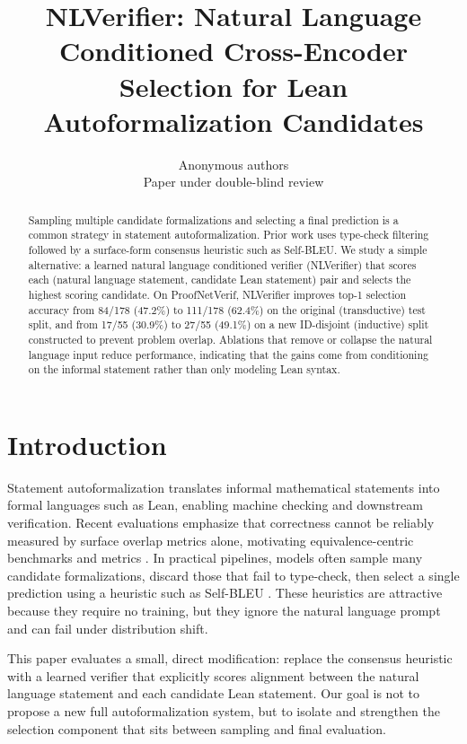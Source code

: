 \documentclass{article}
\title{NLVerifier: Natural Language Conditioned Cross-Encoder Selection for Lean Autoformalization Candidates}
\author{Anonymous authors\\
Paper under double-blind review
}
\begin{document}
\maketitle

\begin{abstract}
Sampling multiple candidate formalizations and selecting a final prediction is a common strategy in statement autoformalization.
Prior work uses type-check filtering followed by a surface-form consensus heuristic such as Self-BLEU.
We study a simple alternative: a learned natural language conditioned verifier (NLVerifier) that scores each (natural language statement, candidate Lean statement) pair and selects the highest scoring candidate.
On ProofNetVerif, NLVerifier improves top-1 selection accuracy from 84/178 (47.2\%) to 111/178 (62.4\%) on the original (transductive) test split, and from 17/55 (30.9\%) to 27/55 (49.1\%) on a new ID-disjoint (inductive) split constructed to prevent problem overlap.
Ablations that remove or collapse the natural language input reduce performance, indicating that the gains come from conditioning on the informal statement rather than only modeling Lean syntax.
\end{abstract}

\section{Introduction}
Statement autoformalization translates informal mathematical statements into formal languages such as Lean, enabling machine checking and downstream verification.
Recent evaluations emphasize that correctness cannot be reliably measured by surface overlap metrics alone, motivating equivalence-centric benchmarks and metrics \citep{poiroux2025reliable}.
In practical pipelines, models often sample many candidate formalizations, discard those that fail to type-check, then select a single prediction using a heuristic such as Self-BLEU \citep{poiroux2025reliable,zhu2018texygen}.
These heuristics are attractive because they require no training, but they ignore the natural language prompt and can fail under distribution shift.

This paper evaluates a small, direct modification: replace the consensus heuristic with a learned verifier that explicitly scores alignment between the natural language statement and each candidate Lean statement.
Our goal is not to propose a new full autoformalization system, but to isolate and strengthen the selection component that sits between sampling and final evaluation.
\end{document}
